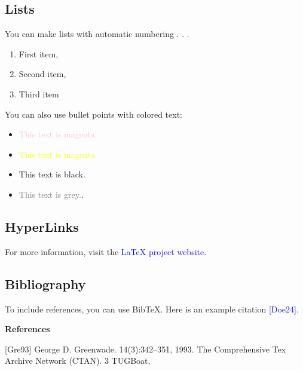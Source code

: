 \documentclass{article}
\begin{document}
	

	\subsection{Lists}
	You can make lists with automatic numbering . . .
		\begin{enumerate}
			\item First item,
			\item Second item,
			\item Third item
		\end{enumerate}
	     You can also use bullet points with colored text:
		\begin{itemize}
			\item \textcolor{pink}{This text is magenta.}
			\item  \textcolor{yellow}{This text is magenta.}
		    \item  This text is black.
		    \item  \textcolor{gray}{This text is grey.}.
		\end{itemize}
	\subsection{HyperLinks}
     For more information, visit the \textcolor{blue}{LaTeX project website.}
	
	\subsection{Bibliography}
     To include references, you can use BibTeX. Here is an example citation \textcolor{blue}{[Doe24].}
	
	
     
    
      \vspace{3mm}
	
	\huge \textbf{References}
	\vspace{4mm}
	
	
   	\small[Gre93] George D. Greenwade.
	14(3):342–351, 1993.
	The Comprehensive Tex Archive Network (CTAN).
	3
	TUGBoat,
	
\end{document}
